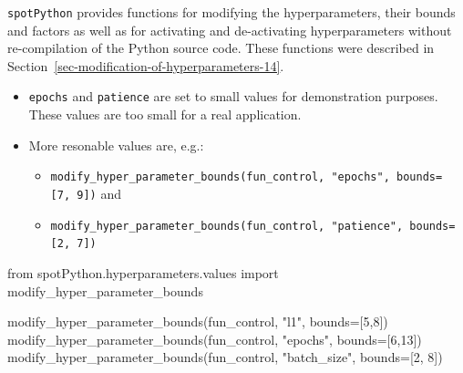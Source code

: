 \documentclass[
  letterpaper,
  DIV=11,
  numbers=noendperiod]{scrreprt}
\newenvironment{Shaded}{\begin{snugshade}}{\end{snugshade}}
\newcommand{\DecValTok}[1]{\textcolor[rgb]{0.68,0.00,0.00}{#1}}
\newcommand{\ImportTok}[1]{\textcolor[rgb]{0.00,0.46,0.62}{#1}}
\newcommand{\NormalTok}[1]{\textcolor[rgb]{0.00,0.23,0.31}{#1}}
\newcommand{\OperatorTok}[1]{\textcolor[rgb]{0.37,0.37,0.37}{#1}}
\newcommand{\StringTok}[1]{\textcolor[rgb]{0.13,0.47,0.30}{#1}}
\providecommand{\tightlist}{%
  \setlength{\itemsep}{0pt}\setlength{\parskip}{0pt}}\usepackage{longtable,booktabs,array}
\begin{document}
\texttt{spotPython} provides functions for modifying the
hyperparameters, their bounds and factors as well as for activating and
de-activating hyperparameters without re-compilation of the Python
source code. These functions were described in
Section~\ref{sec-modification-of-hyperparameters-14}.

\begin{tcolorbox}[enhanced jigsaw, left=2mm, title=\textcolor{quarto-callout-caution-color}{\faFire}\hspace{0.5em}{Caution: Small number of epochs for demonstration purposes}, bottomrule=.15mm, titlerule=0mm, breakable, rightrule=.15mm, toprule=.15mm, coltitle=black, colbacktitle=quarto-callout-caution-color!10!white, leftrule=.75mm, arc=.35mm, colframe=quarto-callout-caution-color-frame, bottomtitle=1mm, colback=white, opacitybacktitle=0.6, toptitle=1mm, opacityback=0]

\begin{itemize}
\tightlist
\item
  \texttt{epochs} and \texttt{patience} are set to small values for
  demonstration purposes. These values are too small for a real
  application.
\item
  More resonable values are, e.g.:

  \begin{itemize}
  \tightlist
  \item
    \texttt{modify\_hyper\_parameter\_bounds(fun\_control,\ "epochs",\ bounds={[}7,\ 9{]})}
    and
  \item
    \texttt{modify\_hyper\_parameter\_bounds(fun\_control,\ "patience",\ bounds={[}2,\ 7{]})}
  \end{itemize}
\end{itemize}

\end{tcolorbox}

\begin{Shaded}
\begin{Highlighting}[]
\ImportTok{from}\NormalTok{ spotPython.hyperparameters.values }\ImportTok{import}\NormalTok{ modify\_hyper\_parameter\_bounds}

\NormalTok{modify\_hyper\_parameter\_bounds(fun\_control, }\StringTok{"l1"}\NormalTok{, bounds}\OperatorTok{=}\NormalTok{[}\DecValTok{5}\NormalTok{,}\DecValTok{8}\NormalTok{])}
\NormalTok{modify\_hyper\_parameter\_bounds(fun\_control, }\StringTok{"epochs"}\NormalTok{, bounds}\OperatorTok{=}\NormalTok{[}\DecValTok{6}\NormalTok{,}\DecValTok{13}\NormalTok{])}
\NormalTok{modify\_hyper\_parameter\_bounds(fun\_control, }\StringTok{"batch\_size"}\NormalTok{, bounds}\OperatorTok{=}\NormalTok{[}\DecValTok{2}\NormalTok{, }\DecValTok{8}\NormalTok{])}
\end{Highlighting}
\end{Shaded}
\end{document}
